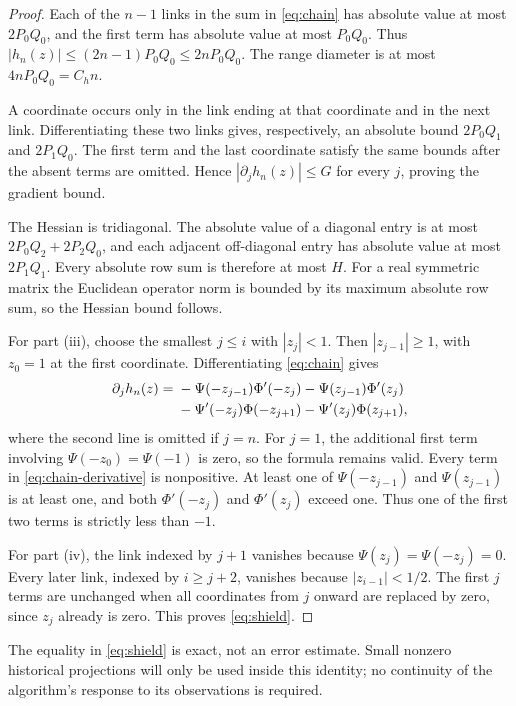 \documentclass[11pt]{article}
\numberwithin{equation}{section}
\theoremstyle{definition}
\theoremstyle{remark}
\begin{document}
\begin{proof}
Each of the $n-1$ links in the sum in \eqref{eq:chain} has absolute value
at most $2P_0Q_0$, and the first term has absolute value at most $P_0Q_0$.
Thus $|h_n(z)|\leq(2n-1)P_0Q_0\leq2nP_0Q_0$. The range diameter is at most
$4nP_0Q_0=C_hn$.

A coordinate occurs only in the link ending at that coordinate and in the
next link. Differentiating these two links gives, respectively, an absolute
bound $2P_0Q_1$ and $2P_1Q_0$. The first term and the last coordinate satisfy
the same bounds after the absent terms are omitted. Hence
$|\partial_jh_n(z)|\leq G$ for every $j$, proving the gradient bound.

The Hessian is tridiagonal. The absolute value of a diagonal entry is at
most $2P_0Q_2+2P_2Q_0$, and each adjacent off-diagonal entry has absolute
value at most $2P_1Q_1$. Every absolute row sum is therefore at most $H$.
For a real symmetric matrix the Euclidean operator norm is bounded by its
maximum absolute row sum, so the Hessian bound follows.

For part (iii), choose the smallest $j\leq i$ with $|z_j|<1$.
Then $|z_{j-1}|\geq1$, with $z_0=1$ at the first coordinate.
Differentiating \eqref{eq:chain} gives
\begin{align}
 \partial_jh_n(z)
 ={}&-\Psi(-z_{j-1})\Phi'(-z_j)-\Psi(z_{j-1})\Phi'(z_j)\notag\\
    &-\Psi'(-z_j)\Phi(-z_{j+1})-\Psi'(z_j)\Phi(z_{j+1}),
 \label{eq:chain-derivative}
\end{align}
where the second line is omitted if $j=n$. For $j=1$, the additional first
term involving $\Psi(-z_0)=\Psi(-1)$ is zero, so the formula remains valid.
Every term in \eqref{eq:chain-derivative} is nonpositive. At least one of
$\Psi(-z_{j-1})$ and $\Psi(z_{j-1})$ is at least one, and both
$\Phi'(-z_j)$ and $\Phi'(z_j)$ exceed one. Thus one of the first two terms
is strictly less than $-1$.

For part (iv), the link indexed by $j+1$ vanishes because
$\Psi(z_j)=\Psi(-z_j)=0$. Every later link, indexed by $i\geq j+2$, vanishes
because $|z_{i-1}|<1/2$. The first $j$ terms are unchanged when all
coordinates from $j$ onward are replaced by zero, since $z_j$ already is
zero. This proves \eqref{eq:shield}.
\end{proof}

The equality in \eqref{eq:shield} is exact, not an error estimate.
Small nonzero historical projections will only be used inside this
identity; no continuity of the algorithm's response to its observations is
required.
\end{document}
